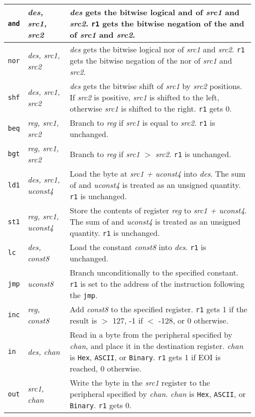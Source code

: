 \documentclass[10pt]{report}
\begin{document}
\begin{tabular}{|ll|p{4.5in}|}
\hline
        {\tt and}       & {\em des, src1, src2} &
                {\em des} gets the bitwise logical {\sc and} of
                {\em src1} and {\em src2}.  {\tt r1} gets the
                bitwise negation of the {\sc and} of {\em src1} and {\em src2}. \\
\hline
        {\tt nor}        & {\em des, src1, src2} &
                {\em des} gets the bitwise logical {\sc nor} of
                {\em src1} and {\em src2}.  {\tt r1} gets the
                bitwise negation of the {\sc nor}
		of {\em src1} and {\em src2}. \\
\hline
        {\tt shf}        & {\em des, src1, src2} &
		{\em des} gets the bitwise shift of {\em src1} by
		{\em src2} positions.  If {\em src2} is positive,
		{\em src1} is shifted to the left, otherwise
		{\em src1} is shifted to the right.  {\tt r1} gets 0. \\
\hline
{\tt beq}       & {\em reg, src1, src2} &
        Branch to {\em reg} if {\em src1} is equal to {\em src2}.
        {\tt r1} is unchanged. \\
\hline
{\tt bgt}       & {\em reg, src1, src2} &
        Branch to {\em reg} if {\em src1} $>$ {\em src2}.
        {\tt r1} is unchanged. \\
\hline
{\tt ld1}        & {\em des, src1, uconst4} & 
        Load the byte at {\em src1 + uconst4} into {\em des}.
	The sum of {\em} and {\em uconst4} is treated as an unsigned quantity.
        {\tt r1} is unchanged.
        \\
\hline
{\tt st1}        & {\em reg, src1, uconst4} &
        Store the contents of register {\em reg} to {\em src1 + uconst4}.
	The sum of {\em} and {\em uconst4} is treated as an unsigned quantity.
        {\tt r1} is unchanged.
        \\
\hline
{\tt lc}        & {\em des, const8}      & 
        Load the constant {\em const8} into {\em des}.
        {\tt r1} is unchanged. \\
\hline
{\tt jmp}	& {\em uconst8}	&
	Branch unconditionally to the specified constant.
	{\tt r1} is set to the address
	of the instruction following the {\tt jmp}. \\
\hline

{\tt inc}	& {\em reg, const8}	&
	Add {\em const8} to the specified register.
                {\tt r1} gets 1 if the result is $>$ 127,
		-1 if $<$ -128, or 0 otherwise. \\
\hline

{\tt in}	& {\em des, chan}	&
	Read in a byte from the peripheral specified by {\em chan},
	and place it in the destination register.  {\em chan} is
	{\tt Hex}, {\tt ASCII}, or {\tt Binary}.
	{\tt r1} gets 1 if EOI is reached, 0 otherwise. \\
\hline
{\tt out}	& {\em src1, chan}	&
	Write the byte in the {\em src1} register to the peripheral
	specified by {\em chan}. {\em chan} is
	{\tt Hex}, {\tt ASCII}, or {\tt Binary}.
	{\tt r1} gets 0. \\


\end{tabular}
\end{document}
